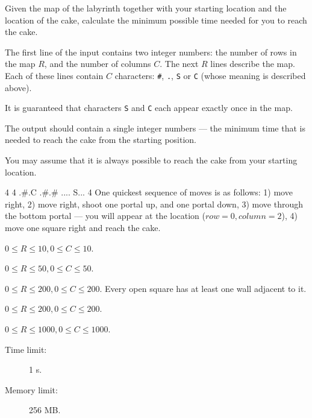 \documentclass{boi2014}
\newcommand{\constant}[1]{{\tt #1}}
\begin{document}
    \Task
    Given the map of the labyrinth together with your starting location
    and the location of the cake, calculate the minimum possible time needed
    for you to reach the cake.

    \Input
    The first line of the input contains two integer numbers: the number of rows
    in the map $R$, and the number of columns $C$. The next $R$ lines describe
    the map. Each of these lines contain $C$ characters: \constant{\#},
    \constant{.}, \constant{S} or \constant{C} (whose meaning is described
    above).

    It is guaranteed that characters \constant{S} and \constant{C} each appear
    exactly once in the map.

    \Output
    The output should contain a single integer numbers --- the minimum time that
    is needed to reach the cake from the starting position.

    You may assume that it is always possible to reach the cake from your
    starting location.

    \Example
    \example
    {
        4 4\newline
        .\#.C\newline
        .\#.\#\newline
        ....\newline
        S...
    }
    {
        4
    }
    {
        One quickest sequence of moves is as follows: 1) move right, 2) move
        right, shoot one portal up, and one portal down, 3) move through the
        bottom portal --- you will appear at the location ($row = 0,
        column = 2$), 4) move one square right and reach the cake.
    }

    \Scoring

    \begin{description}[leftmargin=0pt]
        \item[Subtask 1 (20 points):] $0 \le R \le 10, 0 \le C \le 10$.
        \item[Subtask 2 (20 points):] $0 \le R \le 50, 0 \le C \le 50$.
        \item[Subtask 3 (20 points):] $0 \le R \le 200, 0 \le C \le 200$.
        Every open square has at least one wall adjacent to it.
        \item[Subtask 4 (20 points):] $0 \le R \le 200, 0 \le C \le 200$.
        \item[Subtask 5 (20 points):] $0 \le R \le 1000, 0 \le C \le 1000$.
    \end{description}

    \Constraints

    \begin{description}
        \item[Time limit:] 1 s.
        \item[Memory limit:] 256 MB.
    \end{description}
\end{document}
